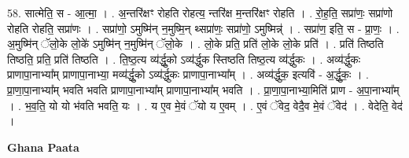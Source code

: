 \documentclass[17pt]{extarticle}
\begin{document}
58. सात्मेति॒ स - आ॒त्मा॒ । . अ॒न्तरि॑क्षꣳ रोहति रोहत्य॒ न्तरि॑क्ष म॒न्तरि॑क्षꣳ रोहति । . रो॒ह॒ति॒ सप्रा॑णः॒ सप्रा॑णो रोहति रोहति॒ सप्रा॑णः । . सप्रा॑णो॒ ऽमुष्मि॑न् न॒मुष्मि॒न् थ्सप्रा॑णः॒ सप्रा॑णो॒ ऽमुष्मिन्न्॑ । . सप्रा॑ण॒ इति॒ स - प्रा॒णः॒ । . अ॒मुष्मि॑न् ॅलो॒के लो॒के॑ ऽमुष्मि॑न् न॒मुष्मि॑न् ॅलो॒के । . लो॒के प्रति॒ प्रति॑ लो॒के लो॒के प्रति॑ । . प्रति॑ तिष्ठति तिष्ठति॒ प्रति॒ प्रति॑ तिष्ठति । . ति॒ष्ठ॒त्य व्य॑र्द्धु॒को ऽव्य॑र्द्धुक स्तिष्ठति तिष्ठ॒त्य व्य॑र्द्धुकः । . अव्य॑र्द्धुकः प्राणापा॒नाभ्या᳚म् प्राणापा॒नाभ्या॒ मव्य॑र्द्धु॒को ऽव्य॑र्द्धुकः प्राणापा॒नाभ्या᳚म् । . अव्य॑र्द्धुक॒ इत्यवि॑ - अ॒र्द्धु॒कः॒ । . प्रा॒णा॒पा॒नाभ्या᳚म् भवति भवति प्राणापा॒नाभ्या᳚म् प्राणापा॒नाभ्या᳚म् भवति । . प्रा॒णा॒पा॒नाभ्या॒मिति॑ प्राण - अ॒पा॒नाभ्या᳚म् । . भ॒व॒ति॒ यो यो भ॑वति भवति॒ यः । . य ए॒व मे॒वं ॅयो य ए॒वम् । . ए॒वं ॅवेद॒ वेदै॒व मे॒वं ॅवेद॑ । . वेदेति॒ वेद॑ । \newline

\textbf{Ghana Paata } \newline
\end{document}
